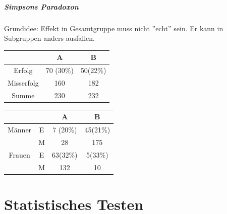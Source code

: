 \documentclass[10pt]{report}
\theoremstyle{definition}
\begin{document}
\paragraph{Simpsons Paradoxon}
Grundidee: Effekt in Gesamtgruppe muss nicht ''echt'' sein. Er kann in Subgruppen anders ausfallen.

\begin{tabular}{|c|c|c|}
	\hline 
	& A & B \\ 
	\hline 
	Erfolg & 70 (30\%) &  50(22\%) \\ 
	\hline 
	Misserfolg & 160 & 182 \\ 
	\hline 
	Summe & 230 & 232 \\ 
	\hline 
\end{tabular} 

\begin{tabular}{|c|c|c|c|}
	\hline 
	&   & A & B \\ 
	\hline 
	Männer & E & 7 (20\%) & 45(21\%) \\ 
	\hline 
	& M & 28 & 175 \\ 
	\hline 
	Frauen & E & 63(32\%) & 5(33\%) \\ 
	\hline 
	& M  & 132 & 10 \\ 
	\hline 
\end{tabular} 

\chapter{Statistisches Testen}
\end{document}
